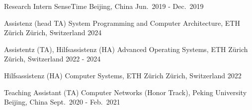 
\begin{cventries}
    \cventry
    {Research Intern}
    {SenseTime}
    {Beijing, China}
    {Jun.\ 2019 - Dec.\ 2019}
    {}
\end{cventries}


\begin{cventries}
    \cventry
    {Assistenz (head TA)}
    {System Programming and Computer Architecture, ETH Z\"urich}
    {Z\"urich, Switzerland}
    {2024}
    {}

    \cventry
    {Assistentz (TA), Hilfsassistenz (HA)}
    {Advanced Operating Systems, ETH Z\"urich}
    {Z\"urich, Switzerland}
    {2022 - 2024}
    {}

    \cventry
    {Hilfsassistenz (HA)}
    {Computer Systems, ETH Z\"urich}
    {Z\"urich, Switzerland}
    {2022}
    {}

    \cventry
    {Teaching Assistant (TA)}
    {Computer Networks (Honor Track), Peking University}
    {Beijing, China}
    {Sept.\ 2020 - Feb.\ 2021}
    {}
\end{cventries}
